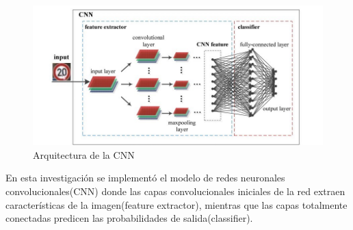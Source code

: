 		\begin{figure}[H]
		\includegraphics[width=1\textwidth]{images/desarrollo/networkArquitec/tempGeneralCNNmodel}
		\begin{center}
		\caption{\small{Arquitectura de la CNN}}
		
		{\small{\fontsize{10}{16.8}\selectfont {Extreme Learning Classifier}}}
		\end{center}
		\vspace{-1.5em}
		\end{figure}

	En esta investigación se implementó el modelo de redes neuronales convolucionales(CNN) donde las capas convolucionales iniciales de la red extraen características de la imagen(feature extractor), mientras que las capas totalmente conectadas predicen las probabilidades de salida(classifier).

